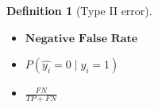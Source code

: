 \documentclass{article}
\theoremstyle{MyNonumberplain}
\theoremstyle{break}
\theoremstyle{break}
\theoremstyle{break}
\theoremstyle{break}
\newtheorem{definition}{Definition}[section]
\begin{document}
\begin{defbox}
    \begin{definition}[Type II error]
        \begin{itemize}
            below are things equivalent to Type II error:
            \item $\textbf{Negative False Rate}$
            \item $P(\hat{y_i} = 0 \mid y_i = 1)$
            \item $\frac{FN}{TP + FN}$
        \end{itemize}
    \end{definition}
\end{defbox}
\end{document}
